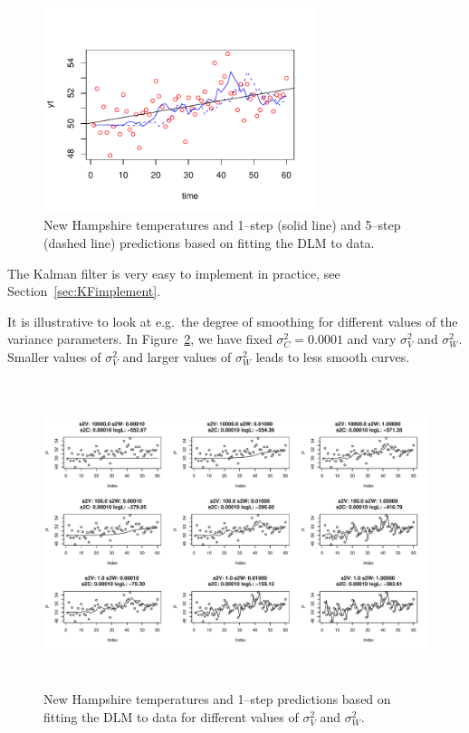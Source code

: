 \begin{figure}[ht]
  \centering
  \includegraphics[height=6cm]{fig/nht-06}
  \caption{New Hampshire temperatures and 1--step (solid line) and
    5--step (dashed line) predictions based on fitting the DLM to  data. }
  \label{fig:nht06}
\end{figure}

The Kalman filter is very easy to implement in practice, see
Section~\ref{sec:KFimplement}. 

It is illustrative to look at e.g.\ the degree of smoothing for
different values of the variance parameters. In
Figure~\ref{fig:nht07}, we have fixed $\sigma^2_C=0.0001$ and vary 
$\sigma^2_V$ and $\sigma^2_W$. Smaller values of $\sigma^2_V$ and
larger values of $\sigma^2_W$ leads to
less smooth curves. 

\begin{figure}[ht]
  \centering
  \includegraphics[height=9cm]{fig/nht-07}
  \caption{New Hampshire temperatures and 1--step  
    predictions based on fitting the DLM to data for different values
    of  $\sigma^2_V$ and $\sigma^2_W$. }
  \label{fig:nht07}
\end{figure}


